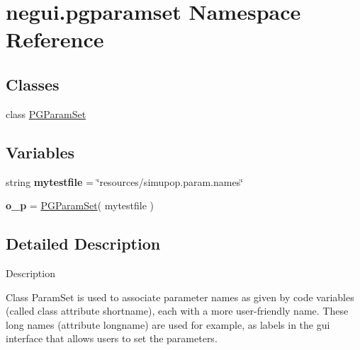 \hypertarget{namespacenegui_1_1pgparamset}{}\section{negui.\+pgparamset Namespace Reference}
\label{namespacenegui_1_1pgparamset}
\subsection*{Classes}
\begin{DoxyCompactItemize}
\item 
class \hyperlink{classnegui_1_1pgparamset_1_1PGParamSet}{P\+G\+Param\+Set}
\end{DoxyCompactItemize}
\subsection*{Variables}
\begin{DoxyCompactItemize}
\item 
string {\bfseries mytestfile} = \char`\"{}resources/simupop.\+param.\+names\char`\"{}\hypertarget{namespacenegui_1_1pgparamset_a1cd4bee064476d7d9a0d584745c5357f}{}\label{namespacenegui_1_1pgparamset_a1cd4bee064476d7d9a0d584745c5357f}

\item 
{\bfseries o\+\_\+p} = \hyperlink{classnegui_1_1pgparamset_1_1PGParamSet}{P\+G\+Param\+Set}( mytestfile )\hypertarget{namespacenegui_1_1pgparamset_aff6bbb0931ed54d22d751c75b88d51ed}{}\label{namespacenegui_1_1pgparamset_aff6bbb0931ed54d22d751c75b88d51ed}

\end{DoxyCompactItemize}


\subsection{Detailed Description}
\begin{DoxyVerb}Description

Class ParamSet is used to associate
parameter names as given by code variables
(called class attribute shortname),
each with a more user-friendly
name.  These long names (attribute longname) are used
for example, as labels in the gui interface
that allows  users to set the parameters.
\end{DoxyVerb}
 
